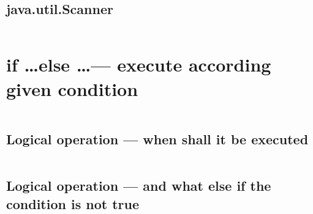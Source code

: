 \documentclass[
  11pt, %
  xcolor=dvipsnames
]{beamer}
\begin{document}
\subsection{java.util.Scanner}
\begin{frame}[fragile]

	\begin{columns}[c]
		\begin{column}{0.9\textwidth}


		\end{column}
	\end{columns}

\end{frame}


\section{if \dots else \dots --- execute according given condition}
\begin{frame}[fragile]

	\begin{columns}[c]
		\begin{column}{0.9\textwidth}


		\end{column}
	\end{columns}

\end{frame}

\subsection{Logical operation --- when shall it be executed}
\begin{frame}[fragile]

	\begin{columns}[c]
		\begin{column}{0.9\textwidth}


		\end{column}
	\end{columns}

\end{frame}

\subsection{Logical operation --- and what else if the condition is not true}
\begin{frame}[fragile]

	\begin{columns}[c]
		\begin{column}{0.9\textwidth}


		\end{column}
	\end{columns}

\end{frame}
\end{document}
